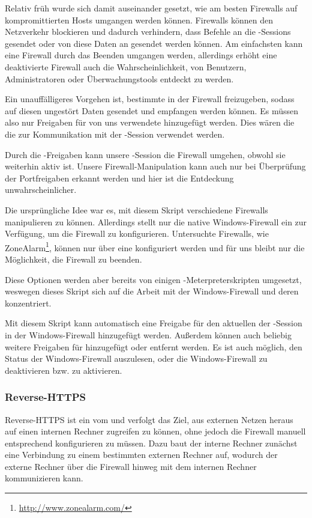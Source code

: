 Relativ früh wurde sich damit auseinander gesetzt, wie am besten Firewalls
auf kompromittierten Hosts umgangen werden können. Firewalls können den
Netzverkehr blockieren und dadurch verhindern, dass Befehle an die
-Sessions gesendet oder von diese Daten an  gesendet werden
können. Am einfachsten kann eine Firewall durch das Beenden umgangen werden,
allerdings erhöht eine deaktivierte Firewall auch die Wahrscheinlichkeit, von
Benutzern, Administratoren oder Überwachungstools entdeckt zu werden.

Ein unauffälligeres Vorgehen ist, bestimmte  in der Firewall freizugeben,
sodass auf diesen ungestört Daten gesendet und empfangen werden können.
Es müssen also nur Freigaben für von uns verwendete  hinzugefügt
werden. Dies wären \zB die  die zur Kommunikation mit der
-Session verwendet werden.

Durch die -Freigaben kann unsere -Session die Firewall
umgehen, obwohl sie weiterhin aktiv ist. Unsere Firewall-Manipulation kann
auch nur bei Überprüfung der Portfreigaben erkannt werden und hier
ist die Entdeckung unwahrscheinlicher.

Die ursprüngliche Idee war es, mit diesem Skript verschiedene
Firewalls manipulieren zu können. Allerdings stellt nur die native
Windows-Firewall ein  zur Verfügung, um die Firewall zu
konfigurieren. Untersuchte Firewalls, wie \zB
ZoneAlarm\footnote{\url{http://www.zonealarm.com/}}, können nur über
eine  konfiguriert werden und für uns bleibt nur die
Möglichkeit, die Firewall zu beenden.

Diese Optionen werden aber bereits von einigen -Meterpreterskripten
umgesetzt, weswegen dieses Skript sich auf die Arbeit mit der
Windows-Firewall und deren  konzentriert.

Mit diesem Skript kann automatisch eine Freigabe für den aktuellen
 der -Session in der Windows-Firewall hinzugefügt werden.
Außerdem können auch beliebig weitere Freigaben für  hinzugefügt
oder entfernt werden. Es ist auch möglich, den Status der Windows-Firewall
auszulesen, oder die Windows-Firewall zu deaktivieren bzw. zu aktivieren.

\subsubsection{Reverse-HTTPS}
\authors{\DH}{\MW \and \JF}

Reverse-HTTPS ist ein  vom  und verfolgt das Ziel, aus
externen Netzen heraus auf einen internen Rechner zugreifen zu können,
ohne jedoch die Firewall manuell entsprechend konfigurieren zu
müssen. Dazu baut der interne Rechner zunächst eine Verbindung zu
einem bestimmten externen Rechner auf, wodurch der externe Rechner
über die Firewall hinweg mit dem internen Rechner kommunizieren kann.

